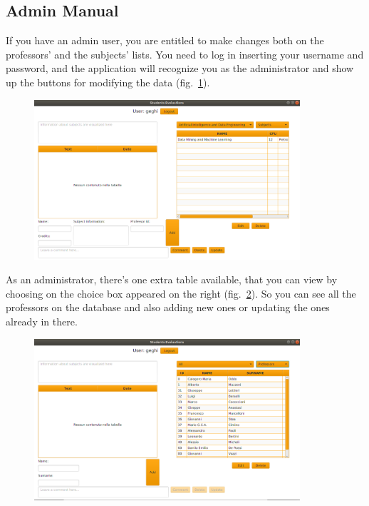 \documentclass[a4paper]{article}
\begin{document}
\clearpage
\subsection{Admin Manual}
If you have an admin user, you are entitled to make changes both on the professors' and the subjects' lists. You need to log in inserting your username and password, and the application will recognize you as the administrator and show up the buttons for modifying the data (fig.~\ref{fig:adminLogin}).

\begin{figure}[h]
\centering
\includegraphics[width=0.88\textwidth]{images/screens/adminLogin}
\label{fig:adminLogin}
\end{figure}
As an administrator, there's one extra table available, that you can view by choosing on the choice box appeared on the right (fig.~\ref{fig:admin0}). So you can see all the professors on the database and also adding new ones or updating the ones already in there.

\begin{figure}[h]
\centering
\includegraphics[width=0.88\textwidth]{images/screens/admin0}
\label{fig:admin0}
\end{figure}
\end{document}
